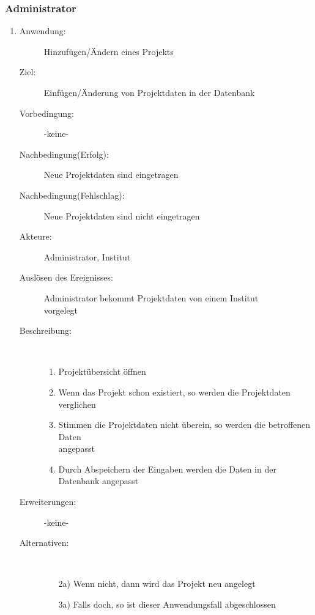 \documentclass[parskip=full]{scrartcl}
\newcommand{\swtLabel}[1]{\textbf{\textbackslash #1\arabic*0\textbackslash}}
\begin{document}
\subsubsection{Administrator}
\begin{enumerate} [label=\swtLabel{A}]
  \item
    \begin{description}
  	\item[Anwendung:] Hinzufügen/Ändern eines Projekts
  	\item[Ziel:] Einfügen/Änderung von Projektdaten in der Datenbank
  	\item[Vorbedingung:] -keine-
  	\item[Nachbedingung(Erfolg):] Neue Projektdaten sind eingetragen
  	\item[Nachbedingung(Fehlschlag):] Neue Projektdaten sind nicht eingetragen
  	\item[Akteure:] Administrator, Institut
  	\item[Auslösen des Ereignisses:] Administrator bekommt Projektdaten von einem
  	Institut\\ vorgelegt
  	\item[Beschreibung:]~
  	\begin{enumerate} 
  	  \item Projektübersicht öffnen
  	  \item Wenn das Projekt schon existiert, so werden die Projektdaten
  	  verglichen
  	  \item Stimmen die Projektdaten nicht überein, so werden die betroffenen
  	  Daten\\ angepasst
  	  \item Durch Abspeichern der Eingaben werden die Daten in der Datenbank
  	  angepasst
  	\end{enumerate}
  	\item[Erweiterungen:] -keine-
  	\item[Alternativen:]~
  	\begin{enumerate}
  	  \item[2a)] Wenn nicht, dann wird das Projekt neu angelegt
  	  \item[3a)] Falls doch, so ist dieser Anwendungsfall abgeschlossen
  	\end{enumerate} 
  \end{description}
   

\end{enumerate}
\end{document}
